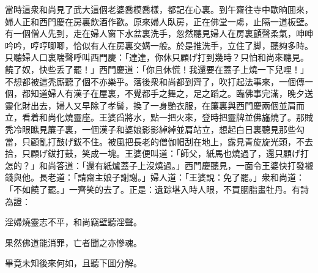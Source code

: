 當時這衆和尚見了武大這個老婆喬模喬樣，都記在心裏。到午齋往寺中歇晌囬來，婦人正和西門慶在房裏飲酒作歡。原來婦人臥房，正在佛堂一䖏，止隔一道板壁。有一個僧人先到，走在婦人窗下水盆裏洗手，忽然聽見婦人在房裏顫聲柔氣，呻呻吟吟，哼哼唧唧，恰似有人在房裏交媾一般。於是推洗手，立住了脚，聽夠多時。只聽婦人口裏喘聲呼叫西門慶：「達達，你休只顧げ打到幾時？只怕和尚來聽見。饒了奴，快些丢了罷！」西門慶道：「你且休慌！我還要在蓋子上燒一下兒哩！」不想都被這秃廝聽了個不亦樂乎。落後衆和尚都到齊了，吹打起法事來，一個傳一個，都知道婦人有漢子在屋裏，不覺都手之舞之，足之蹈之。臨佛事完滿，晚夕送靈化財出去，婦人又早除了孝髻，換了一身艷衣服，在簾裏與西門慶兩個並肩而立，看着和尚化燒靈座。王婆舀將水，點一把火來，登時把靈牌並佛旛燒了。那賊秃冷眼瞧見簾子裏，一個漢子和婆娘影影綽綽並肩站立，想起白日裏聽見那些勾當，只顧亂打鼓げ鈸不住。被風把長老的僧伽帽刮在地上，露見青旋旋光頭，不去拾，只顧げ鈸打鼓，笑成一塊。王婆便叫道：「師父，紙馬也燒過了，還只顧げ打怎的？」和尚答道：「還有紙爐蓋子上沒燒過。」西門慶聽見，一面令王婆快打發襯錢與他。長老道：「請齋主娘子謝謝。」婦人道：「王婆說：免了罷。」衆和尚道：「不如饒了罷。」一齊笑的去了。正是：遺踪堪入時人眼，不買胭脂畫牡丹。有詩為證：
\begin{myquote}
淫婦燒靈志不平，和尚竊壁聽淫聲。

果然佛道能消罪，亡者聞之亦慘魂。
\end{myquote}

畢竟未知後來何如，且聽下囬分解。

